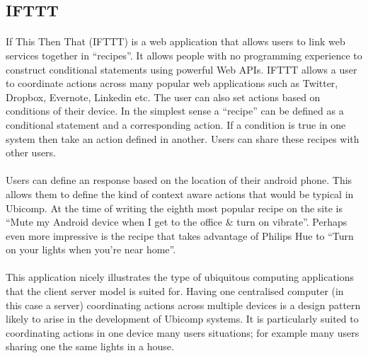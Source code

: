 \documentclass[11pt]{amsart}
\begin{document}
\subsection{IFTTT}\cite{IFTTT}
\paragraph{}
If This Then That (IFTTT) is a web application that allows users to link web services together in ``recipes''. It allows people with no programming experience to construct conditional statements using powerful Web APIs. 
IFTTT allows a user to coordinate actions across many popular web applications such as Twitter, Dropbox, Evernote, Linkedin etc. The user can also set actions based on conditions of their device. In the simplest sense a ``recipe'' can be defined as a conditional statement and a corresponding action. If a condition is true in one system then take an action defined in another. Users can share these recipes with other users.
\paragraph{}
Users can define an response based on the location of their android phone. This allows them to define the kind of context aware actions that would be typical in Ubicomp. At the time of writing the eighth most popular recipe on the site is ``Mute my Android device when I get to the office & turn on vibrate''. Perhaps even more impressive is the recipe that takes advantage of Philips Hue to ``Turn on your lights when you're near home''.
\paragraph{}
This application nicely illustrates the type of ubiquitous computing applications that the client server model is suited for. Having one centralised computer (in this case a server) coordinating actions across multiple devices is a design pattern likely to arise in the development of Ubicomp systems. It is particularly suited to coordinating actions in one device many users situations; for example many users sharing one the same lights in a house.
\end{document}
